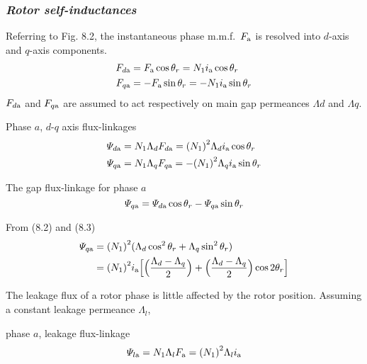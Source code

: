 \documentclass[a4paper,numbers=noenddot,12pt]{scrbook}
\begin{document}
\subsubsection{\textit{Rotor self-inductances}} Referring to Fig. 8.2, the instantaneous phase m.m.f.\ $F_{\textup{a}}$ is resolved into $d$-axis and $q$-axis components.
\begin{equation}
    \begin{aligned}
        F_{d\textup{a}} & = F_{\textup{a}} \cos \theta_r = N_1 i_{\textup{a}} \cos \theta_r \\
        F_{q\textup{a}} & = - F_{\textup{a}} \sin \theta_r = - N_1 i_{\textup{a}} \sin \theta_r
    \end{aligned}
    \label{eq:Eq8.1}
\end{equation}
$F_{d\textup{a}}$ and $F_{q\textup{a}}$ are assumed to act respectively on main gap permeances $\Lambda d$ and $\Lambda q$.

Phase $a$, $d$-$q$ axis flux-linkages
\begin{equation}
    \begin{aligned}
        \varPsi_{d\textup{a}} & = N_1 \Lambda_d F_{d\textup{a}} = {(N_1)}^2 \Lambda_d i_{\textup{a}} \cos \theta_r \\
\varPsi_{q\textup{a}} & = N_1 \Lambda_q F_{q\textup{a}} = - {(N_1)}^2 \Lambda_q i_{\textup{a}} \sin \theta_r 
    \end{aligned}
    \label{eq:Eq8.2}
\end{equation}

The gap flux-linkage for phase $a$
\begin{equation}
    \varPsi_{q\textup{a}} = \varPsi_{d\textup{a}} \cos \theta_r - \varPsi_{q\textup{a}} \sin \theta_r
    \label{eq:Eq8.3}
\end{equation}

From (8.2) and (8.3)
\begin{align}
    \varPsi_{q\textup{a}} & = {(N_1)}^2(\Lambda_d \cos^2 \theta_r + \Lambda_q \sin^2 \theta_r) \nonumber \\
    & = {(N_1)}^2 i_{\textup{a}} \Big[ \Big(\dfrac{\Lambda_d -\Lambda_q}{2}\Big) + \Big( \dfrac{\Lambda_d - \Lambda_q}{2} \Big) \cos 2\theta_r \Big]
    \label{eq:Eq8.4}
\end{align}

The leakage flux of a rotor phase is little affected by the rotor position. Assuming a constant leakage permeance $\Lambda_l$,

phase $a$, leakage flux-linkage
\begin{equation}
    \varPsi_{l\textup{a}} = N_1 \Lambda_l F_{\textup{a}} = {(N_1)}^2 \Lambda_l i_{\textup{a}} 
    \label{eq:Eq8.5}
\end{equation}
\end{document}

